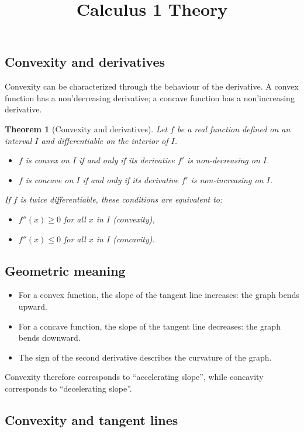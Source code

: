 \documentclass[11pt,a4paper]{article} \usepackage[T1]{fontenc}
\theoremstyle{plain} \newtheorem{theorem}{Theorem} \title{Calculus 1 Theory}
\begin{document}
\subsection {Convexity and derivatives}

Convexity can be characterized through the behaviour of the derivative. A
convex function has a non’decreasing derivative; a concave function has a
non’increasing derivative.

\begin{theorem}
[Convexity and derivatives] Let $f$ be a real function defined on an interval
$I$ and differentiable on the interior of $I$.

\begin{itemize}
\item $f$ is convex on $I$ if and only if its derivative $f'$ is non-decreasing
on $I$.
\item $f$ is concave on $I$ if and only if its derivative $f'$ is
non-increasing on $I$.
\end{itemize}

If $f$ is twice differentiable, these conditions are equivalent to:

\begin{itemize}
\item $f''(x) \ge 0$ for all $x$ in $I$ \quad (convexity),
\item $f''(x) \le 0$ for all $x$ in $I$ \quad (concavity).
\end{itemize}

\end{theorem}

\subsection*{Geometric meaning}

\begin{itemize}
\item For a convex function, the slope of the tangent line increases: the graph
bends upward.
\item For a concave function, the slope of the tangent line decreases: the
graph bends downward.
\item The sign of the second derivative describes the curvature of the graph.
\end{itemize}

Convexity therefore corresponds to “accelerating slope”, while concavity
corresponds to “decelerating slope”.

\subsection {Convexity and tangent lines}
\end{document}
